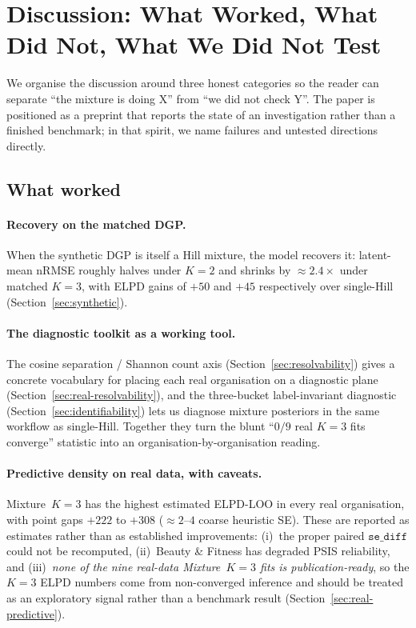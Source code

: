 \documentclass[11pt]{article}
\begin{document}
\section{Discussion: What Worked, What Did Not, What We Did Not Test}
\label{sec:discussion}

We organise the discussion around three honest categories so the reader can separate ``the mixture is doing X'' from ``we did not check Y''. The paper is positioned as a preprint that reports the state of an investigation rather than a finished benchmark; in that spirit, we name failures and untested directions directly.

\subsection{What worked}

\paragraph{Recovery on the matched DGP.} When the synthetic DGP is itself a Hill mixture, the model recovers it: latent-mean nRMSE roughly halves under $K=2$ and shrinks by $\approx 2.4\times$ under matched $K=3$, with ELPD gains of $+50$ and $+45$ respectively over single-Hill (Section~\ref{sec:synthetic}).

\paragraph{The diagnostic toolkit as a working tool.} The cosine separation / Shannon count axis (Section~\ref{sec:resolvability}) gives a concrete vocabulary for placing each real organisation on a diagnostic plane (Section~\ref{sec:real-resolvability}), and the three-bucket label-invariant diagnostic (Section~\ref{sec:identifiability}) lets us diagnose mixture posteriors in the same workflow as single-Hill. Together they turn the blunt ``$0/9$ real $K=3$ fits converge'' statistic into an organisation-by-organisation reading.

\paragraph{Predictive density on real data, with caveats.} Mixture~$K=3$ has the highest estimated ELPD-LOO in every real organisation, with point gaps $+222$ to $+308$ ($\approx 2$--$4$ coarse heuristic SE). These are reported as estimates rather than as established improvements: (i)~the proper paired $\mathtt{se\_diff}$ could not be recomputed, (ii)~Beauty \& Fitness has degraded PSIS reliability, and (iii)~\emph{none of the nine real-data Mixture~$K=3$ fits is publication-ready}, so the $K=3$ ELPD numbers come from non-converged inference and should be treated as an exploratory signal rather than a benchmark result (Section~\ref{sec:real-predictive}).
\end{document}
